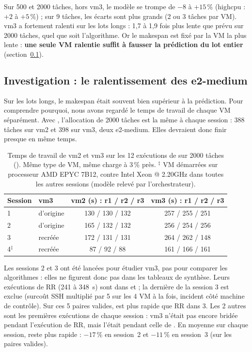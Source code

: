 Sur 500 et 2000 tâches, hors vm3, le modèle se trompe de $-8$ à $+15\,\%$
(highcpu : $+2$ à $+5\,\%$) ; sur 9 tâches, les écarts sont plus grands (2 ou
3 tâches par VM). vm3 a fortement ralenti sur les lots longs : 1,7 à 1,9 fois
plus lente que prévu sur 2000 tâches, quel que soit l'algorithme. Or le makespan
est fixé par la VM la plus lente : \textbf{une seule VM ralentie suffit à fausser
la prédiction du lot entier} (section~\ref{sec:vm3}).

\subsection{Investigation : le ralentissement des e2-medium}
\label{sec:vm3}

Sur les lots longs, le makespan était souvent bien supérieur à la prédiction.
Pour comprendre pourquoi, nous avons regardé le temps de travail de chaque VM
séparément. Avec \sel{}, l'allocation de 2000 tâches est la même à chaque
session : 388 tâches sur vm2 et 398 sur vm3, deux e2-medium. Elles devraient donc
finir presque en même temps.

\begin{table}[H]
\centering\small
\begin{tabular}{llcc}
\toprule
\textbf{Session} & \textbf{vm3} & \textbf{vm2 (s) : r1 / r2 / r3} & \textbf{vm3 (s) : r1 / r2 / r3} \\
\midrule
1 & d'origine & 130 / 130 / 132 & 257 / 255 / 251 \\
2 & d'origine & 165 / 132 / 132 & 256 / 254 / 256 \\
3 & recréée   & 172 / 131 / 131 & 264 / 262 / 148 \\
4$^{\ddagger}$ & recréée &  87 /  92 /  88 & 161 / 166 / 161 \\
\bottomrule
\end{tabular}
\caption{Temps de travail de vm2 et vm3 sur les 12 exécutions de \sel{} sur
2000 tâches (\mesure{}). Même type de VM, même charge à 3\,\% près.
$^{\ddagger}$ VM démarrées sur processeur AMD EPYC 7B12, contre Intel Xeon @ 2.20GHz dans toutes les autres sessions (modèle relevé par l'orchestrateur).}
\label{tab:vm2vm3}
\end{table}

Les sessions 2 et 3 ont été lancées pour étudier vm3, pas pour comparer les
algorithmes : elles ne figurent donc pas dans les tableaux de synthèse. Leurs
exécutions de RR (241 à 348~s) sont dans 
et  ; la dernière de la session 3 est exclue (surcoût
SSH multiplié par 5 sur les 4 VM à la fois, incident côté machine de contrôle).
Sur ces 5 paires valides, \sel{} est plus rapide que RR dans 3. Les 2 autres sont
les premières exécutions de chaque session : vm3 n'était pas encore bridée pendant
l'exécution de RR, mais l'était pendant celle de \sel{}. En moyenne sur chaque
session, \sel{} reste plus rapide : $-17\,\%$ en session~2 et $-11\,\%$ en
session~3 (sur les paires valides).

